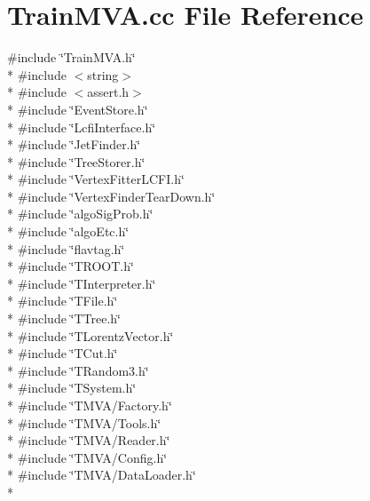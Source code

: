\section{Train\-M\-V\-A.\-cc File Reference}
\label{TrainMVA_8cc}
{\ttfamily \#include \char`\"{}Train\-M\-V\-A.\-h\char`\"{}}\\*
{\ttfamily \#include $<$string$>$}\\*
{\ttfamily \#include $<$assert.\-h$>$}\\*
{\ttfamily \#include \char`\"{}Event\-Store.\-h\char`\"{}}\\*
{\ttfamily \#include \char`\"{}Lcfi\-Interface.\-h\char`\"{}}\\*
{\ttfamily \#include \char`\"{}Jet\-Finder.\-h\char`\"{}}\\*
{\ttfamily \#include \char`\"{}Tree\-Storer.\-h\char`\"{}}\\*
{\ttfamily \#include \char`\"{}Vertex\-Fitter\-L\-C\-F\-I.\-h\char`\"{}}\\*
{\ttfamily \#include \char`\"{}Vertex\-Finder\-Tear\-Down.\-h\char`\"{}}\\*
{\ttfamily \#include \char`\"{}algo\-Sig\-Prob.\-h\char`\"{}}\\*
{\ttfamily \#include \char`\"{}algo\-Etc.\-h\char`\"{}}\\*
{\ttfamily \#include \char`\"{}flavtag.\-h\char`\"{}}\\*
{\ttfamily \#include \char`\"{}T\-R\-O\-O\-T.\-h\char`\"{}}\\*
{\ttfamily \#include \char`\"{}T\-Interpreter.\-h\char`\"{}}\\*
{\ttfamily \#include \char`\"{}T\-File.\-h\char`\"{}}\\*
{\ttfamily \#include \char`\"{}T\-Tree.\-h\char`\"{}}\\*
{\ttfamily \#include \char`\"{}T\-Lorentz\-Vector.\-h\char`\"{}}\\*
{\ttfamily \#include \char`\"{}T\-Cut.\-h\char`\"{}}\\*
{\ttfamily \#include \char`\"{}T\-Random3.\-h\char`\"{}}\\*
{\ttfamily \#include \char`\"{}T\-System.\-h\char`\"{}}\\*
{\ttfamily \#include \char`\"{}T\-M\-V\-A/\-Factory.\-h\char`\"{}}\\*
{\ttfamily \#include \char`\"{}T\-M\-V\-A/\-Tools.\-h\char`\"{}}\\*
{\ttfamily \#include \char`\"{}T\-M\-V\-A/\-Reader.\-h\char`\"{}}\\*
{\ttfamily \#include \char`\"{}T\-M\-V\-A/\-Config.\-h\char`\"{}}\\*
{\ttfamily \#include \char`\"{}T\-M\-V\-A/\-Data\-Loader.\-h\char`\"{}}\\*
